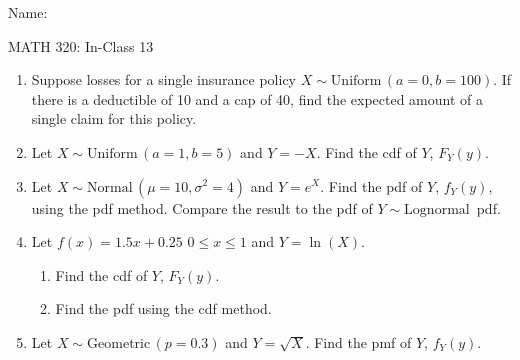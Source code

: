 \documentclass{article}
\newcommand{\follow}[1]{\sim \text{#1}\,}		%
\begin{document}
\hspace{375pt}Name:

\begin{center}
{\Huge MATH 320: In-Class 13}

\end{center}
\bigskip\bigskip



\begin{enumerate}
    \item Suppose losses for a single insurance policy $X \follow{Uniform}(a = 0, b = 100)$. If there is a deductible of 10 and a cap of 40, find the expected amount of a single claim for this policy.\vspace{200pt}%
    
    \item Let $X \follow{Uniform}(a = 1, b = 5)$ and $Y = -X$. Find the cdf of $Y$, $F_Y(y)$.\vspace{200pt}
    
    \item Let $X \follow{Normal}(\mu = 10, \sigma^2 = 4)$ and $Y = e^X$. Find the pdf of $Y$, $f_Y(y)$, using the pdf method. Compare the result to the pdf of $Y \follow{Lognormal}$ pdf.\vspace{200pt}%
    
    \item Let $f(x) = 1.5x + 0.25$ \quad $0 \le x \le 1$ and $Y = \ln(X)$.%
    \begin{enumerate}
        \item Find the cdf of $Y$, $F_Y(y)$.\vspace{200pt}
        \item Find the pdf using the cdf method.\vspace{200pt}
    \end{enumerate}
    
    \item Let $X \follow{Geometric}(p = 0.3)$ and $Y = \sqrt{X}$. Find the pmf of $Y$, $f_Y(y)$.\vspace{200pt}%

\end{enumerate}
\end{document}

